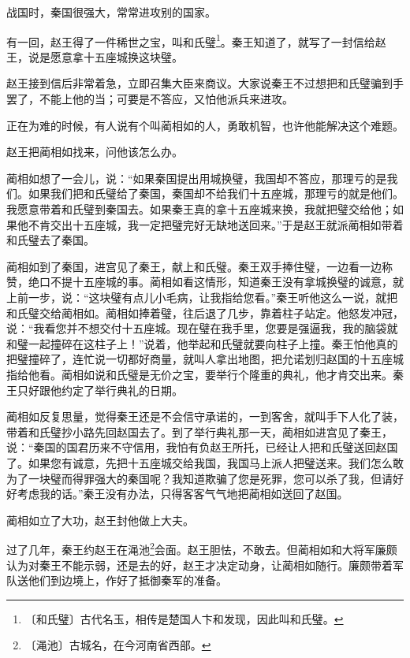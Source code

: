 \documentclass[12pt,UTF-8,openany]{ctexbook}
\begin{document}
\begin{large}
    
    战国时，秦国很强大，常常进攻别的国家。
    
    有一回，赵王得了一件稀世之宝，叫和氏璧\footnote{〔和氏璧〕古代名玉，相传是楚国人卞和发现，因此叫和氏璧。}。秦王知道了，就写了一封信给赵王，说是愿意拿十五座城换这块璧。
    
    赵王接到信后非常着急，立即召集大臣来商议。大家说秦王不过想把和氏璧骗到手罢了，不能上他的当；可要是不答应，又怕他派兵来进攻。
    
    正在为难的时候，有人说有个叫蔺相如的人，勇敢机智，也许他能解决这个难题。
    
    赵王把蔺相如找来，问他该怎么办。
    
    蔺相如想了一会儿，说：“如果秦国提出用城换璧，我国却不答应，那理亏的是我们。如果我们把和氏璧给了秦国，秦国却不给我们十五座城，那理亏的就是他们。我愿意带着和氏璧到秦国去。如果秦王真的拿十五座城来换，我就把璧交给他；如果他不肯交出十五座城，我一定把璧完好无缺地送回来。”于是赵王就派蔺相如带着和氏璧去了秦国。
    
    蔺相如到了秦国，进宫见了秦王，献上和氏璧。秦王双手捧住璧，一边看一边称赞，绝口不提十五座城的事。蔺相如看这情形，知道秦王没有拿城换璧的诚意，就上前一步，说：“这块璧有点儿小毛病，让我指给您看。”秦王听他这么一说，就把和氏璧交给蔺相如。蔺相如捧着璧，往后退了几步，靠着柱子站定。他怒发冲冠，说：“我看您并不想交付十五座城。现在璧在我手里，您要是强逼我，我的脑袋就和璧一起撞碎在这柱子上！”说着，他举起和氏璧就要向柱子上撞。秦王怕他真的把璧撞碎了，连忙说一切都好商量，就叫人拿出地图，把允诺划归赵国的十五座城指给他看。蔺相如说和氏璧是无价之宝，要举行个隆重的典礼，他才肯交出来。秦王只好跟他约定了举行典礼的日期。
    
    蔺相如反复思量，觉得秦王还是不会信守承诺的，一到客舍，就叫手下人化了装，带着和氏璧抄小路先回赵国去了。到了举行典礼那一天，蔺相如进宫见了秦王，说：“秦国的国君历来不守信用，我怕有负赵王所托，已经让人把和氏璧送回赵国了。如果您有诚意，先把十五座城交给我国，我国马上派人把璧送来。我们怎么敢为了一块璧而得罪强大的秦国呢？我知道欺骗了您是死罪，您可以杀了我，但请好好考虑我的话。”秦王没有办法，只得客客气气地把蔺相如送回了赵国。
    
    蔺相如立了大功，赵王封他做上大夫。
    
    过了几年，秦王约赵王在渑池\footnote{〔渑池〕古城名，在今河南省西部。}会面。赵王胆怯，不敢去。但蔺相如和大将军廉颇认为对秦王不能示弱，还是去的好，赵王才决定动身，让蔺相如随行。廉颇带着军队送他们到边境上，作好了抵御秦军的准备。
    

\end{large}
\end{document}
